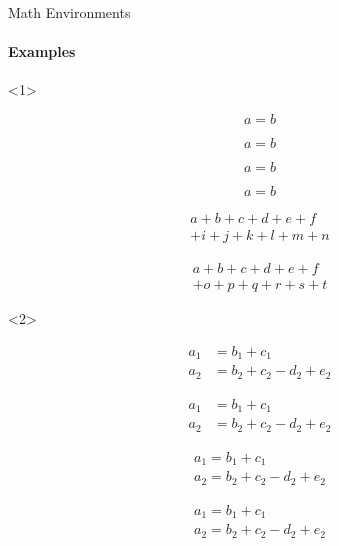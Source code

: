\begin{frame}[fragile]{Math Environments}
	\framesubtitle{Examples}

	\begin{onlyenv}
\begin{codesource}
	\begin{equation}
		a = b
	\end{equation}
\end{codesource}	
	\begin{equation}
		a = b
	\end{equation}
	
\begin{codesource}
	\begin{equation*}
		a = b
	\end{equation*}
\end{codesource}	
	\begin{equation*}
		a = b
	\end{equation*}
	
\begin{codesource}
	\begin{multline}
		a + b + c + d + e + f \\
		+ i + j + k + l + m + n
	\end{multline}
\end{codesource}
	\begin{multline}
	a + b + c + d + e + f \\
	+ o + p + q + r + s + t
	\end{multline}	
	\end{onlyenv}

	\begin{onlyenv}
\begin{codesource}
	\begin{align}
		a_1 &= b_1 + c_1 \\
		a_2 &= b_2 + c_2 - d_2 + e_2
	\end{align}
\end{codesource}
	\begin{align}
		a_1 &= b_1 + c_1 \\
		a_2 &= b_2 + c_2 - d_2 + e_2
	\end{align}
	
\begin{codesource}
	\begin{gather}
		a_1 = b_1 + c_1 \\
		a_2 = b_2 + c_2 - d_2 + e_2
	\end{gather}
\end{codesource}
	\begin{gather}
		a_1 = b_1 + c_1 \\
		a_2 = b_2 + c_2 - d_2 + e_2
	\end{gather}
	\end{onlyenv}


\end{frame}
